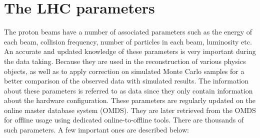\section{The LHC parameters}
\label{s:lhc_param}
The proton beams have a number of associated parameters such as the energy of each beam, 
collision frequency, number of particles in each beam, luminosity etc. An accurate 
and updated knowledge of these parameters is very important during the data taking.
Because they are used in the reconstruction of various physics objects, as well as 
to apply correction on simulated Monte Carlo samples for a better comparison of the 
observed data with simulated results. The information about these parameters is referred to as
 data since they only contain information about the hardware 
configuration. These parameters are regularly updated on the online master database
system (OMDS). They are later retrieved from the OMDS for offline usage
using dedicated online-to-offline tools. There are thousands of such parameters. 
A few important ones are described below:
